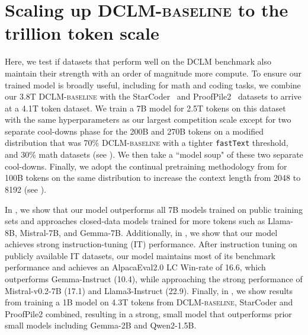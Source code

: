 \documentclass{article}
\newcommand{\dclm}{\textsc{DCLM}\xspace}
\newcommand{\hqpool}{\textsc{DCLM-baseline}\xspace}
\newcommand{\fasttext}{\texttt{fastText}\xspace}
\newcommand{\llama}{Llama\xspace}
\begin{document}
\section{Scaling up \hqpool to the trillion token scale}
\label{sec:hero_run}

Here, we test if datasets that perform well on the \dclm benchmark also maintain their strength with an order of magnitude more compute.
To ensure our trained model is broadly useful, including for math and coding tasks, we combine our 3.8T \hqpool{} with
the StarCoder~\citep{li2023starcoder} and ProofPile2~\citep{azerbayev2023llemma} datasets to arrive at a 4.1T token dataset.
We train a 7B model for 2.5T tokens on this dataset with the same hyperparameters as our largest competition scale except for two separate cool-downs phase for the 200B and 270B tokens on a modified distribution that was 70\% \hqpool with a tighter \fasttext threshold, and 30\% math datasets (see ). We then take a ``model soup" of these two separate cool-downs\citep{wortsman2022model}. Finally, we adopt the continual pretraining methodology from \citet{pouransari2024dataset} for 100B tokens on the same distribution to increase the context length from 2048 to 8192 (see ).

In , we show that our model outperforms all 7B models trained on public training sets and approaches closed-data models trained for more tokens such as \llama-8B, Mistral-7B, and Gemma-7B. Additionally, in , we show that our model achieves strong instruction-tuning (IT) performance. After instruction tuning on publicly available IT datasets, our model maintains most of its benchmark performance and achieves an AlpacaEval2.0 LC Win-rate of 16.6, which outperforms Gemma-Instruct (10.4), while approaching the strong performance of  Mistral-v0.2-7B (17.1) and Llama3-Instruct (22.9).
Finally, in , we show results from training a 1B model on 4.3T tokens from \hqpool, StarCoder and ProofPile2 combined, resulting in a strong, small model that outperforms prior small models including Gemma-2B and Qwen2-1.5B.
\end{document}
